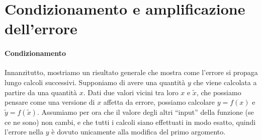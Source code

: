 \documentclass[a4paper]{report}
\theoremstyle{definition}
\theoremstyle{remark}
\begin{document}
\section{Condizionamento e amplificazione dell'errore}

\paragraph{Condizionamento} Innanzitutto, mostriamo un risultato generale che mostra come l'errore si propaga lungo calcoli successivi. Supponiamo di avere una quantità $y$ che viene calcolata a partire da una quantità $x$. Dati due valori vicini tra loro $x$ e $\tilde{x}$, che possiamo pensare come una versione di $x$ affetta da errore, possiamo calcolare $y = f(x)$ e $\tilde{y} = f(\tilde{x})$. Assumiamo per ora che il valore degli altri ``input'' della funzione (se ce ne sono) non cambi, e che tutti i calcoli siano effettuati in modo esatto, quindi l'errore nella $y$ è dovuto unicamente alla modifica del primo argomento. 
\end{document}
